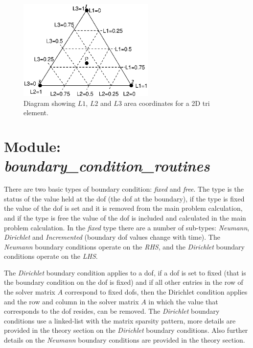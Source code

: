 \begin{figure}
\centering
      \includegraphics[width=0.6\textwidth]{figs/Modules/Tri_area_coordinates.eps}
\caption{Diagram showing $L1$, $L2$ and $L3$ area coordinates for a 2D 
tri element.}
\label{Tri_area_coordinates}
\end{figure}


\section{Module: \emph{boundary\_condition\_routines}} 
\label{sec:boundaryconditionroutines}

There are two basic types of boundary condition: \emph{fixed} and 
\emph{free}. The type is the status of the value held at the dof (the 
dof at the boundary), if the type is fixed the value of the dof is 
set and it is removed from the main problem calculation, and if the type 
is free the value of the dof is included and calculated in the main 
problem calculation. In the \emph{fixed} type there are a number of 
sub-types: \emph{Neumann}, \emph{Dirichlet} and \emph{Incremented} 
(boundary dof values change with time). The \emph{Neumann} boundary 
conditions operate on the \emph{RHS}, and the \emph{Dirichlet} boundary 
conditions operate on the \emph{LHS}. 

The \emph{Dirichlet} boundary condition applies to a dof, if a dof is 
set to fixed (that is the boundary condition on the dof is fixed) and 
if all other entries in the row of the solver matrix $A$ correspond to 
fixed dofs, then the Dirichlet condition applies and the row and column 
in the solver matrix $A$ in which the value that corresponds to the dof 
resides, can be removed. The \emph{Dirichlet} boundary conditions use 
a linked-list with the matrix sparsity pattern, more details are provided 
in the theory section on the \emph{Dirichlet} boundary conditions. Also 
further details on the \emph{Neumann} boundary conditions are provided 
in the theory section.

